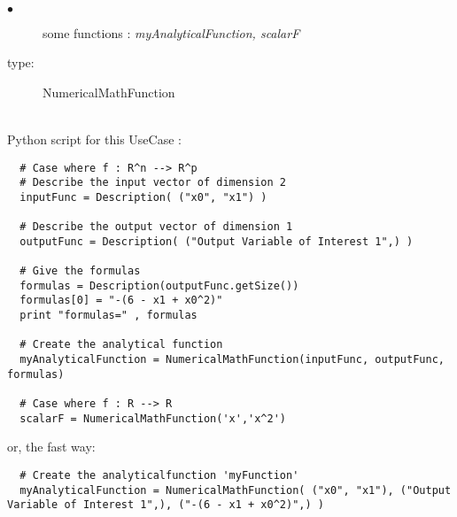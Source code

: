 \textspace\\

{
  \begin{description}
  \item[$\bullet$] some functions : {\itshape myAnalyticalFunction, scalarF}
  \item[type:] NumericalMathFunction
  \end{description}
}

\textspace\\
Python script for this UseCase :

\begin{lstlisting}
  # Case where f : R^n --> R^p
  # Describe the input vector of dimension 2
  inputFunc = Description( ("x0", "x1") )

  # Describe the output vector of dimension 1
  outputFunc = Description( ("Output Variable of Interest 1",) )

  # Give the formulas
  formulas = Description(outputFunc.getSize())
  formulas[0] = "-(6 - x1 + x0^2)"
  print "formulas=" , formulas

  # Create the analytical function 
  myAnalyticalFunction = NumericalMathFunction(inputFunc, outputFunc, formulas)

  # Case where f : R --> R
  scalarF = NumericalMathFunction('x','x^2')
\end{lstlisting}

or, the fast way:
\begin{lstlisting} 
  # Create the analyticalfunction 'myFunction'
  myAnalyticalFunction = NumericalMathFunction( ("x0", "x1"), ("Output Variable of Interest 1",), ("-(6 - x1 + x0^2)",) )
\end{lstlisting}

